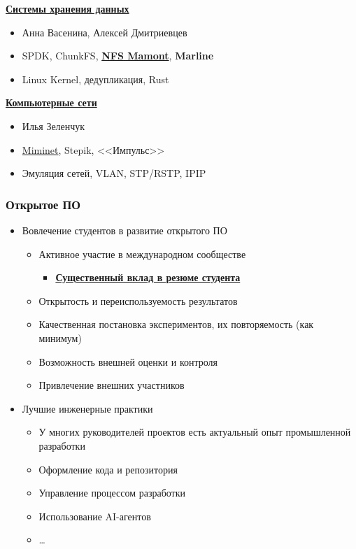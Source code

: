 \documentclass[xcolor=table,aspectratio=169]{beamer}
\begin{document}
\begin{frame}[fragile]
\begin{minipage}{0.48\textwidth}
{\begin{itemize}
        \end{itemize}
        }
        \underline{\textbf{ Системы хранения данных}}
        \small{
        \begin{itemize}\setlength\itemsep{-0.4em}
          \item Анна Васенина, Алексей Дмитриевцев
          \item SPDK, ChunkFS, \textbf{\href{https://github.com/RMamonts/nfs-mamont}{NFS Mamont}}, \textbf{Marline}
          \item Linux Kernel, дедупликация, Rust
        \end{itemize}
        }
        \underline{\textbf{Компьютерные сети}}
        \small{
        \begin{itemize}\setlength\itemsep{-0.4em}
          \item Илья Зеленчук
          \item \href{https://github.com/mimi-net/miminet}{Miminet}, Stepik, <<Импульс>>
          \item Эмуляция сетей, VLAN, STP/RSTP, IPIP
        \end{itemize}
        }
    \end{minipage}
\end{frame}


\begin{frame}[fragile]
  \frametitle{Открытое ПО}
  \begin{itemize}
      \item Вовлечение студентов в развитие открытого ПО 
      \begin{itemize}
        \item Активное участие в международном сообществе
        \begin{itemize}
        \item \textbf{\underline{Существенный вклад в резюме студента}}
        \end{itemize}
        \item Открытость и переиспользуемость результатов
        \item Качественная постановка экспериментов, их повторяемость (как минимум)
        \item Возможность внешней оценки и контроля
        \item Привлечение внешних участников
      \end{itemize}
      \item Лучшие инженерные практики
      \begin{itemize}
        \item У многих руководителей проектов есть актуальный опыт промышленной разработки
        \item Оформление кода и репозитория
        \item Управление процессом разработки
        \item Использование AI-агентов
        \item \ldots
      \end{itemize}
      
  \end{itemize}
\end{frame}
\end{document}

